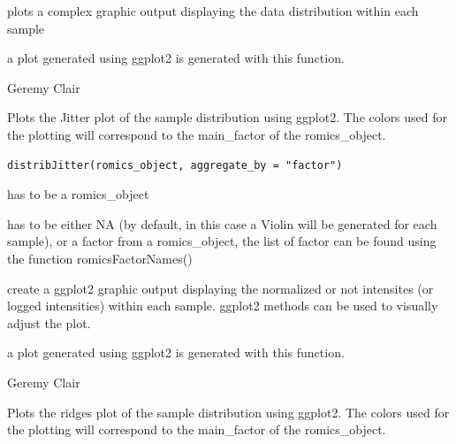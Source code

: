 \documentclass[a4paper]{book}
\begin{document}
%
\begin{Details}
plots a complex graphic output displaying the data distribution within each sample
\end{Details}
%
\begin{Value}
a plot generated using ggplot2 is generated with this function.
\end{Value}
%
\begin{Author}
Geremy Clair
\end{Author}
%
\begin{Description}
Plots the Jitter plot of the sample distribution using ggplot2. The colors used for the plotting will correspond to the main\_factor of the romics\_object.
\end{Description}
%
\begin{Usage}
\begin{verbatim}
distribJitter(romics_object, aggregate_by = "factor")
\end{verbatim}
\end{Usage}
%
\begin{Arguments}
\begin{ldescription}
\item[\code{romics\_object}] has to be a romics\_object

\item[\code{aggregate\_by}] has to be either NA (by default, in this case a Violin will be generated for each sample), or a factor from a romics\_object, the list of factor can be found using the function romicsFactorNames()
\end{ldescription}
\end{Arguments}
%
\begin{Details}
create a ggplot2 graphic output displaying the normalized or not intensites (or logged intensities) within each sample. ggplot2 methods can be used to visually adjust the plot.
\end{Details}
%
\begin{Value}
a plot generated using ggplot2 is generated with this function.
\end{Value}
%
\begin{Author}
Geremy Clair
\end{Author}
%
\begin{Description}
Plots the ridges plot of the sample distribution using ggplot2. The colors used for the plotting will correspond to the main\_factor of the romics\_object.
\end{Description}
\end{document}
